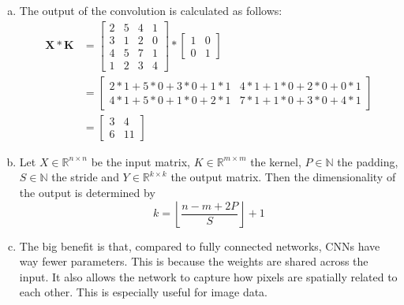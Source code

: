 \begin{enumerate}[(a)]
  \item The output of the convolution is calculated as follows:
        \begin{align}
          \mathbf{X} * \mathbf{K} & = \begin{bmatrix}
                                        2 & 5 & 4 & 1 \\
                                        3 & 1 & 2 & 0 \\
                                        4 & 5 & 7 & 1 \\
                                        1 & 2 & 3 & 4
                                      \end{bmatrix} * \begin{bmatrix}
                                                        1 & 0 \\
                                                        0 & 1
                                                      \end{bmatrix}                \\
                                  & = \begin{bmatrix}
                                        2*1 + 5*0 + 3*0 + 1*1 & 4*1 + 1*0 + 2*0 + 0*1 \\
                                        4*1 + 5*0 + 1*0 + 2*1 & 7*1 + 1*0 + 3*0 + 4*1
                                      \end{bmatrix} \\
                                  & = \begin{bmatrix}
                                        3 & 4  \\
                                        6 & 11
                                      \end{bmatrix}
        \end{align}
  \item Let $X \in \mathbb{R}^{n \times n}$ be the input matrix, $K \in \mathbb{R}^{m \times m}$ the
        kernel, $P \in \mathbb{N}$ the padding, $S \in \mathbb{N}$ the stride and $Y \in
          \mathbb{R}^{k \times k}$ the output matrix. Then the dimensionality of the output is
        determined by
        \begin{equation}
          k = \left\lfloor \frac{n - m + 2P}{S} \right\rfloor + 1
        \end{equation}
  \item The big benefit is that, compared to fully connected networks, CNNs have way fewer
        parameters. This is because the weights are shared across the input. It also allows the
        network to capture how pixels are spatially related to each other. This is especially useful
        for image data.
\end{enumerate}


